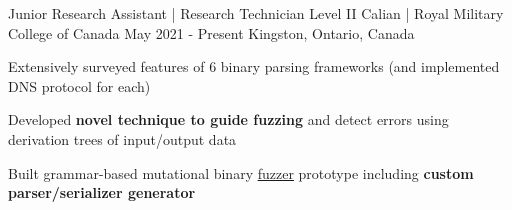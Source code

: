 \begin{cventries}
  \cventry
    {Junior Research Assistant | Research Technician Level II} %
    {Calian | Royal Military College of Canada} %
    {May 2021 - Present} %
    {Kingston, Ontario, Canada} %
    {
      \begin{cvitems} %
        \item{Extensively surveyed features of 6 binary parsing frameworks (and implemented DNS protocol for each)}
        \item{Developed \textbf{novel technique to guide fuzzing} and detect errors using derivation trees of input/output data}
        \item{Built grammar-based mutational binary \href{https://en.wikipedia.org/wiki/Fuzzing}{fuzzer} prototype including \textbf{custom parser/serializer generator}} %

\end{cvitems}}
\end{cventries}
